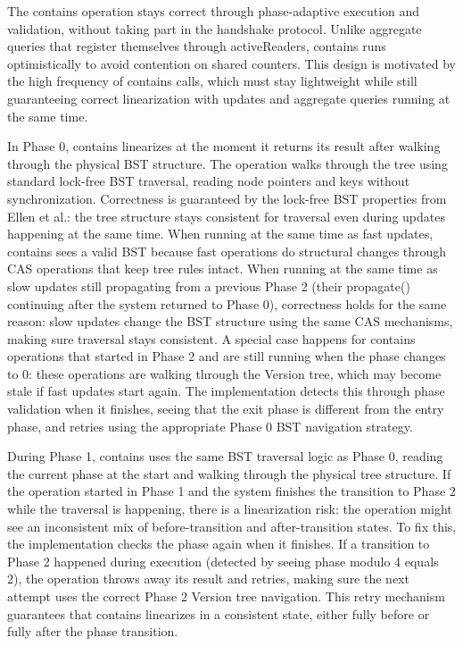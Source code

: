 \documentclass[acmsmall,screen,nonacm]{acmart}
\newcommand{\codestyle}[1]{{{\fontsize{9}{10}\ttfamily #1}}}
\begin{document}
The \codestyle{contains} operation stays correct through phase-adaptive execution and validation, without taking part in the handshake protocol. Unlike aggregate queries that register themselves through \codestyle{activeReaders}, \codestyle{contains} runs optimistically to avoid contention on shared counters. This design is motivated by the high frequency of \codestyle{contains} calls, which must stay lightweight while still guaranteeing correct linearization with updates and aggregate queries running at the same time.

In Phase 0, \codestyle{contains} linearizes at the moment it returns its result after walking through the physical BST structure. The operation walks through the tree using standard lock-free BST traversal, reading node pointers and keys without synchronization. Correctness is guaranteed by the lock-free BST properties from Ellen et al.: the tree structure stays consistent for traversal even during updates happening at the same time. When running at the same time as fast updates, \codestyle{contains} sees a valid BST because fast operations do structural changes through CAS operations that keep tree rules intact. When running at the same time as slow updates still propagating from a previous Phase 2 (their \codestyle{propagate()} continuing after the system returned to Phase 0), correctness holds for the same reason: slow updates change the BST structure using the same CAS mechanisms, making sure traversal stays consistent. A special case happens for \codestyle{contains} operations that started in Phase 2 and are still running when the phase changes to 0: these operations are walking through the Version tree, which may become stale if fast updates start again. The implementation detects this through phase validation when it finishes, seeing that the exit phase is different from the entry phase, and retries using the appropriate Phase 0 BST navigation strategy.

During Phase 1, \codestyle{contains} uses the same BST traversal logic as Phase 0, reading the current phase at the start and walking through the physical tree structure. If the operation started in Phase 1 and the system finishes the transition to Phase 2 while the traversal is happening, there is a linearization risk: the operation might see an inconsistent mix of before-transition and after-transition states. To fix this, the implementation checks the phase again when it finishes. If a transition to Phase 2 happened during execution (detected by seeing phase modulo 4 equals 2), the operation throws away its result and retries, making sure the next attempt uses the correct Phase 2 Version tree navigation. This retry mechanism guarantees that \codestyle{contains} linearizes in a consistent state, either fully before or fully after the phase transition.
\end{document}
